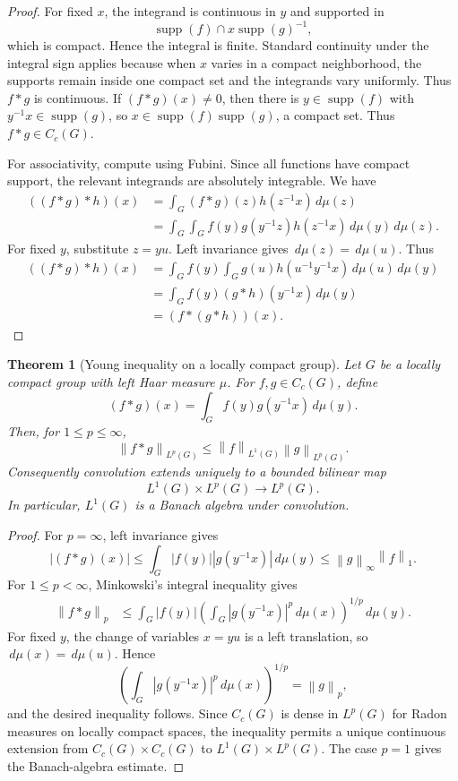 \documentclass[11pt,openany]{book}
\numberwithin{equation}{chapter}
\theoremstyle{definition}
\theoremstyle{plain}
\newtheorem{theorem}[definition]{Theorem}
\theoremstyle{remark}
\newcommand{\1}{\mathbf{1}}
\newcommand{\dd}{\,d}
\newcommand{\abs}[1]{\left\lvert #1\right\rvert}
\newcommand{\norm}[1]{\left\lVert #1\right\rVert}
\newcommand{\supp}{\operatorname{supp}}
\begin{document}
\begin{proof}
For fixed \(x\), the integrand is continuous in \(y\) and supported in
\[
  \supp(f)\cap x\supp(g)^{-1},
\]
which is compact. Hence the integral is finite. Standard continuity under the integral sign applies because when \(x\) varies in a compact neighborhood, the supports remain inside one compact set and the integrands vary uniformly. Thus \(f*g\) is continuous. If \((f*g)(x)\neq0\), then there is \(y\in\supp(f)\) with \(y^{-1}x\in\supp(g)\), so \(x\in\supp(f)\supp(g)\), a compact set. Thus \(f*g\in C_c(G)\).

For associativity, compute using Fubini. Since all functions have compact support, the relevant integrands are absolutely integrable. We have
\begin{align*}
((f*g)*h)(x)
&=\int_G (f*g)(z)h(z^{-1}x)\dd\mu(z)\\
&=\int_G\int_G f(y)g(y^{-1}z)h(z^{-1}x)\dd\mu(y)\dd\mu(z).
\end{align*}
For fixed \(y\), substitute \(z=yu\). Left invariance gives \(\dd\mu(z)=\dd\mu(u)\). Thus
\begin{align*}
((f*g)*h)(x)
&=\int_G f(y)\int_G g(u)h(u^{-1}y^{-1}x)\dd\mu(u)\dd\mu(y)\\
&=\int_G f(y)(g*h)(y^{-1}x)\dd\mu(y)\\
&=(f*(g*h))(x).
\end{align*}
\end{proof}


\begin{theorem}[Young inequality on a locally compact group]
Let \(G\) be a locally compact group with left Haar measure \(\mu\).  For \(f,g\in C_c(G)\), define
\[
  (f*g)(x)=\int_G f(y)g(y^{-1}x)\dd\mu(y).
\]
Then, for \(1\le p\le\infty\),
\[
  \norm{f*g}_{L^p(G)}\le \norm{f}_{L^1(G)}\norm{g}_{L^p(G)}.
\]
Consequently convolution extends uniquely to a bounded bilinear map
\[
  L^1(G)\times L^p(G)\longrightarrow L^p(G).
\]
In particular, \(L^1(G)\) is a Banach algebra under convolution.
\end{theorem}

\begin{proof}
For \(p=\infty\), left invariance gives
\[
  \abs{(f*g)(x)}\le\int_G\abs{f(y)}\abs{g(y^{-1}x)}\dd\mu(y)
  \le \norm{g}_\infty\norm{f}_1.
\]
For \(1\le p<\infty\), Minkowski's integral inequality gives
\[
\begin{aligned}
\norm{f*g}_p
&\le \int_G\abs{f(y)}\left(\int_G\abs{g(y^{-1}x)}^p\dd\mu(x)\right)^{1/p}\dd\mu(y).
\end{aligned}
\]
For fixed \(y\), the change of variables \(x=yu\) is a left translation, so \(\dd\mu(x)=\dd\mu(u)\). Hence
\[
  \left(\int_G\abs{g(y^{-1}x)}^p\dd\mu(x)\right)^{1/p}=\norm{g}_p,
\]
and the desired inequality follows.  Since \(C_c(G)\) is dense in \(L^p(G)\) for Radon measures on locally compact spaces, the inequality permits a unique continuous extension from \(C_c(G)\times C_c(G)\) to \(L^1(G)\times L^p(G)\).  The case \(p=1\) gives the Banach-algebra estimate.
\end{proof}
\end{document}
